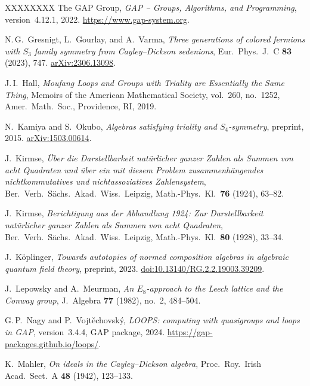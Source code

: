 \documentclass[twoside,english]{paper}
\numberwithin{equation}{section}
\numberwithin{figure}{section}
\theoremstyle{definition}
\theoremstyle{remark}
\begin{document}
\begin{thebibliography}{XXXXXXXX}
The GAP Group,
\emph{GAP -- Groups, Algorithms, and Programming}, version~4.12.1,
2022.
\url{https://www.gap-system.org}.

N.\,G.~Gresnigt, L.~Gourlay, and A.~Varma,
\emph{Three generations of colored fermions with $S_3$ family
symmetry from Cayley--Dickson sedenions},
Eur.\ Phys.\ J.\ C \textbf{83} (2023), 747.
\href{https://arxiv.org/abs/2306.13098}{arXiv:2306.13098}.

J.\,I.~Hall,
\emph{Moufang Loops and Groups with Triality are Essentially the
Same Thing},
Memoirs of the American Mathematical Society, vol.~260, no.~1252,
Amer.\ Math.\ Soc., Providence, RI, 2019.

N.~Kamiya and S.~Okubo,
\emph{Algebras satisfying triality and\/ $S_4$-symmetry},
preprint, 2015.
\href{https://arxiv.org/abs/1503.00614}{arXiv:1503.00614}.

J.~Kirmse,
\emph{\"Uber die Darstellbarkeit nat\"urlicher ganzer Zahlen als Summen
von acht Quadraten und \"uber ein mit diesem Problem zusammenh\"angendes
nichtkommutatives und nichtassoziatives Zahlensystem},
Ber.\ Verh.\ S\"achs.\ Akad.\ Wiss.\ Leipzig, Math.-Phys.\ Kl.\
\textbf{76} (1924), 63--82.

J.~Kirmse,
\emph{Berichtigung aus der Abhandlung 1924: Zur Darstellbarkeit
nat\"urlicher ganzer Zahlen als Summen von acht Quadraten},
Ber.\ Verh.\ S\"achs.\ Akad.\ Wiss.\ Leipzig, Math.-Phys.\ Kl.\
\textbf{80} (1928), 33--34.

J.~K\"oplinger,
\emph{Towards autotopies of normed composition algebras in algebraic
quantum field theory},
preprint, 2023.
\href{https://doi.org/10.13140/RG.2.2.19003.39209}{doi:10.13140/RG.2.2.19003.39209}.

\bibitem[LepowskyMeurman1982]{LepowskyMeurman1982}
J.~Lepowsky and A.~Meurman,
\emph{An\/ $E_8$-approach to the Leech lattice and the Conway group},
J.~Algebra \textbf{77} (1982), no.~2, 484--504.

G.\,P.~Nagy and P.~Vojt\v{e}chovsk\'y,
\emph{LOOPS: computing with quasigroups and loops in GAP},
version~3.4.4, GAP package, 2024.
\url{https://gap-packages.github.io/loops/}.

K.~Mahler,
\emph{On ideals in the Cayley--Dickson algebra},
Proc.\ Roy.\ Irish Acad.\ Sect.\ A \textbf{48} (1942), 123--133.


\end{thebibliography}
\end{document}
